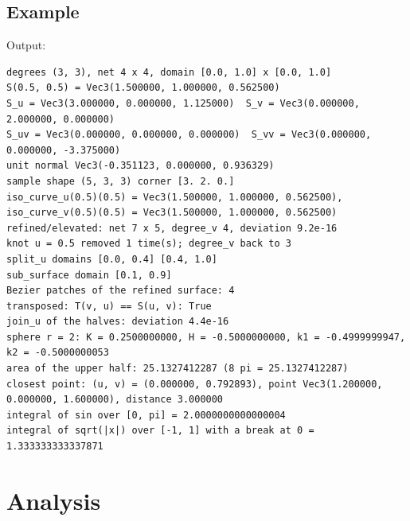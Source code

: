 \subsection{Example}


Output:

\begin{lstlisting}[style=text]
degrees (3, 3), net 4 x 4, domain [0.0, 1.0] x [0.0, 1.0]
S(0.5, 0.5) = Vec3(1.500000, 1.000000, 0.562500)
S_u = Vec3(3.000000, 0.000000, 1.125000)  S_v = Vec3(0.000000, 2.000000, 0.000000)
S_uv = Vec3(0.000000, 0.000000, 0.000000)  S_vv = Vec3(0.000000, 0.000000, -3.375000)
unit normal Vec3(-0.351123, 0.000000, 0.936329)
sample shape (5, 3, 3) corner [3. 2. 0.]
iso_curve_u(0.5)(0.5) = Vec3(1.500000, 1.000000, 0.562500), iso_curve_v(0.5)(0.5) = Vec3(1.500000, 1.000000, 0.562500)
refined/elevated: net 7 x 5, degree_v 4, deviation 9.2e-16
knot u = 0.5 removed 1 time(s); degree_v back to 3
split_u domains [0.0, 0.4] [0.4, 1.0]
sub_surface domain [0.1, 0.9]
Bezier patches of the refined surface: 4
transposed: T(v, u) == S(u, v): True
join_u of the halves: deviation 4.4e-16
sphere r = 2: K = 0.2500000000, H = -0.5000000000, k1 = -0.4999999947, k2 = -0.5000000053
area of the upper half: 25.1327412287 (8 pi = 25.1327412287)
closest point: (u, v) = (0.000000, 0.792893), point Vec3(1.200000, 0.000000, 1.600000), distance 3.000000
integral of sin over [0, pi] = 2.0000000000000004
integral of sqrt(|x|) over [-1, 1] with a break at 0 = 1.333333333337871
\end{lstlisting}

\section{Analysis}\label{sec:surface-analysis}

